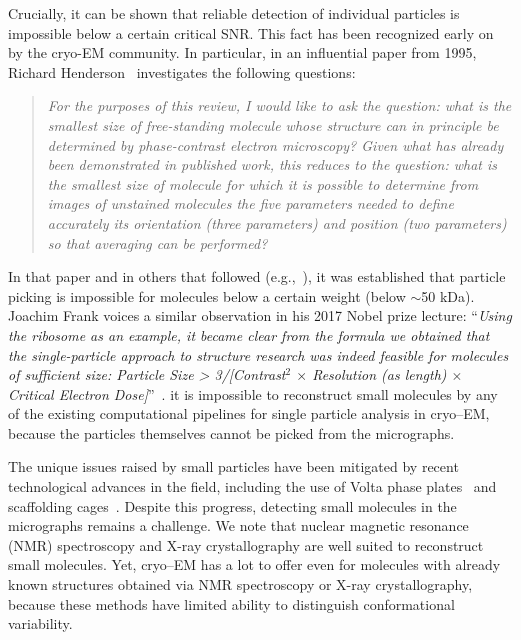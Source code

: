 \documentclass[9pt,twocolumn,twoside,lineno]{pnas-new}
\begin{document}
Crucially, it can be shown that reliable detection of individual particles is impossible below a certain critical SNR. This fact has been recognized early on by the cryo-EM community. In particular, in an influential paper from 1995, Richard Henderson~\cite{henderson1995limitations} investigates the following questions:
\begin{quote}
	\emph{For the purposes of this review, I would like to ask the question: what is the smallest size of free-standing molecule whose structure can in principle be determined by phase-contrast electron microscopy? Given what has already been demonstrated in published work, this reduces to the question: what is the smallest size of molecule for which it is possible to determine from images of unstained molecules the five parameters needed to define accurately its orientation (three parameters) and position (two parameters) so that averaging can be performed?}
\end{quote}
In that paper and in others that followed (e.g.,~\cite{glaeser1999electron}), it was established that particle picking is impossible for molecules below a certain weight (below $\sim$50 kDa). 
Joachim Frank voices a similar observation in his 2017 Nobel prize lecture: ``\emph{Using the ribosome as an example, it became clear from the formula we obtained that the single-particle approach to structure research was indeed feasible for molecules of sufficient size: Particle Size > 3/[Contrast$^2$ $\times$ Resolution (as length) $\times$ Critical Electron Dose]}''~\cite{frank2018single}. 
 it is impossible to reconstruct small molecules by any of the existing computational pipelines for single particle analysis in cryo--EM, because the particles themselves cannot be picked from the micrographs.

The unique issues raised by small particles have been mitigated by recent technological advances in the field, including the use of Volta phase plates~\cite{khoshouei2017cryo,liang2017phase} and scaffolding cages~\cite{liu2018nearatomic}.
Despite this progress, detecting small molecules in the micrographs remains a challenge.
We note that nuclear magnetic resonance (NMR) spectroscopy and X-ray crystallography are well suited to reconstruct small molecules. Yet, cryo--EM has a lot to offer even for molecules with already known structures obtained via NMR spectroscopy or X-ray crystallography, because these methods have limited ability to distinguish conformational variability. 
\end{document}
